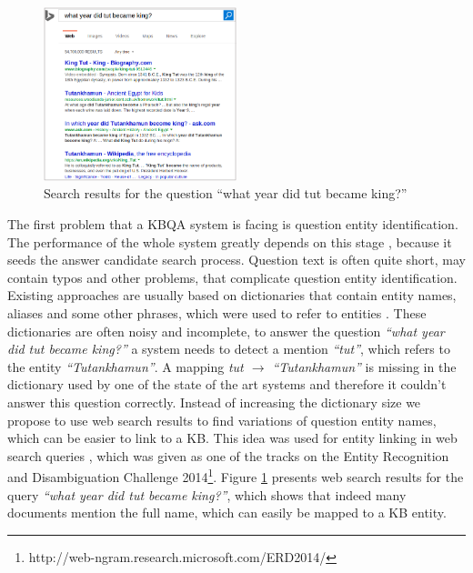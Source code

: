 \begin{figure}
\centering
\includegraphics[width=0.5\textwidth]{img/web_search_entitylink}
\caption{Search results for the question ``what year did tut became king?''}
\label{fig:web_search_entitylink}
\end{figure}

The first problem that a KBQA system is facing is question entity identification.
The performance of the whole system greatly depends on this stage \cite{yao-scratch-qa-naacl2015}, because it seeds the answer candidate search process.
Question text is often quite short, may contain typos and other problems, that complicate question entity identification.
Existing approaches are usually based on dictionaries that contain entity names, aliases and some other phrases, which were used to refer to entities \cite{SPITKOVSKY12.266}.
These dictionaries are often noisy and incomplete, \eg to answer the question \textit{``what year did tut became king?''} a system needs to detect a mention \textit{``tut''}, which refers to the entity \textit{``Tutankhamun''}.
A mapping \textit{tut $\rightarrow$ ``Tutankhamun''} is missing in the dictionary used by one of the state of the art systems and therefore it couldn't answer this question correctly.
Instead of increasing the dictionary size we propose to use web search results to find variations of question entity names, which can be easier to link to a KB.
This idea was used for entity linking in web search queries \cite{SMAPH_ERD:2014}, which was given as one of the tracks on the Entity Recognition and Disambiguation Challenge 2014\footnote{http://web-ngram.research.microsoft.com/ERD2014/}.
Figure \ref{fig:web_search_entitylink} presents web search results for the query \textit{``what year did tut became king?''}, which shows that indeed many documents mention the full name, which can easily be mapped to a KB entity.

